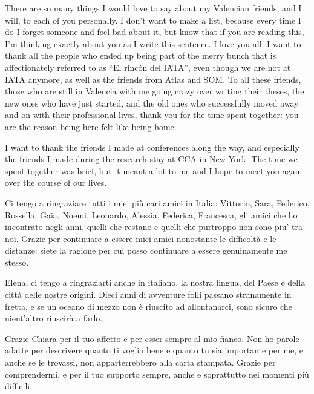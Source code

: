 There are so many things I would love to say about my Valencian friends, and I will, to each of you personally. I don't want to make a list, because every time I do I forget someone and feel bad about it, but know that if you are reading this, I'm thinking exactly about you as I write this sentence. I love you all.
I want to thank all the people who ended up being part of the merry bunch that is affectionately referred to as ``El rincón del IATA'', even though we are not at IATA anymore, as well as the friends from Atlas and SOM. To all these friends, those who are still in Valencia with me going crazy over writing their theses, the new ones who have just started, and the old ones who successfully moved away and on with their professional lives, thank you for the time spent together: you are the reason being here felt like being home.

I want to thank the friends I made at conferences along the way, and especially the friends I made during the research stay at CCA in New York. The time we spent together was brief, but it meant a lot to me and I hope to meet you again over the course of our lives.


Ci tengo a ringraziare tutti i miei più cari amici in Italia:
Vittorio, 
Sara,
Federico, 
Rossella, 
Gaia, 
Noemi, 
Leonardo, 
Alessia,
Federica,
Francesca,
gli amici che ho incontrato negli anni, quelli che restano e quelli che purtroppo non sono piu' tra noi.  
Grazie per continuare a essere miei amici nonostante le difficoltà e le distanze: siete la ragione per cui posso continuare a essere genuinamente me stesso.

Elena, ci tengo a ringraziarti anche in italiano, la nostra lingua, del Paese e della città delle nostre origini. Dieci anni di avventure folli passano stranamente in fretta, e se un oceano di mezzo non è riuscito ad allontanarci, sono sicuro che nient'altro riuscirà a farlo. 

Grazie Chiara per il tuo affetto e per esser sempre al mio fianco. Non ho parole adatte per descrivere quanto ti voglia bene e quanto tu sia importante per me, e anche se le trovassi, non apparterrebbero alla carta stampata. Grazie per comprendermi, e per il tuo supporto sempre, anche e soprattutto nei momenti più difficili.

